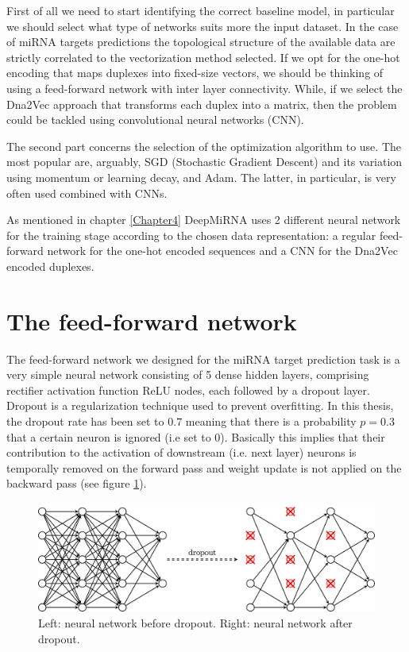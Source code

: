 First of all we need to start identifying the correct baseline model, in particular we should select what type of networks suits more the input dataset. In the case of miRNA targets predictions the topological structure of the available data are strictly correlated to the vectorization method selected. If we opt for the one-hot encoding that maps duplexes into fixed-size vectors, we should be thinking of using a feed-forward network with inter layer connectivity. While, if we select the Dna2Vec approach that transforms each duplex into a matrix, then the problem could be tackled using convolutional neural networks (CNN)\cite{dl}.  

The second part concerns the selection of the optimization algorithm to use. The most popular are, arguably, SGD (Stochastic Gradient Descent) and its variation using momentum or learning decay, and Adam. The latter, in particular, is very often used combined with CNNs.

As mentioned in chapter \ref{Chapter4} DeepMiRNA uses 2 different neural network for the training stage according to the chosen data representation: a regular feed-forward network for the one-hot encoded sequences and a CNN for the Dna2Vec encoded duplexes. 

\section{The feed-forward network} 
The feed-forward network we designed for the miRNA target prediction task is a very simple neural network consisting of 5 dense hidden layers, comprising rectifier activation function ReLU nodes, each followed by a dropout layer. Dropout \cite{dropout} is a regularization technique used to prevent overfitting. In this thesis, the dropout rate has been set to $0.7$ meaning that there is a probability $p = 0.3$ that a certain neuron is ignored (i.e set to 0). Basically this implies that their contribution to the activation of downstream (i.e. next layer) neurons  is temporally removed on the forward pass and weight update is not applied on the backward pass (see figure \ref{fig:dropout}).

\begin{figure}[hbt!]
	\centering
	\includegraphics[width=\textwidth, height=0.3\textheight]{Figures/dropout}
	\caption{Left: neural network before dropout. Right: neural network after dropout.}
	\label{fig:dropout}
\end{figure}   

